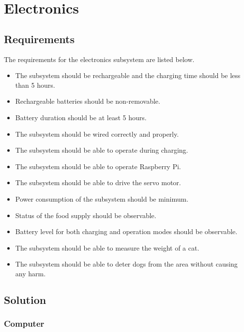 \section{Electronics} \label{sec:elec}

\subsection{Requirements}

The requirements for the electronics subsystem are listed below.
\begin{itemize}
\item The subsystem should be rechargeable and the charging time should be less than 5 hours. %

\item Rechargeable batteries should be non-removable.
\item Battery duration should be at least 5 hours.
\item The subsystem should be wired correctly and properly.
\item The subsystem should be able to operate during charging.
\item The subsystem should be able to operate Raspberry Pi.
\item The subsystem should be able to drive the servo motor.
\item Power consumption of the subsystem should be minimum. %
\item Status of the food supply should be observable.
\item Battery level for both charging and operation modes should be observable.
\item The subsystem should be able to measure the weight of a cat.
\item The subsystem should be able to deter dogs from the area without causing any harm.
\end{itemize}

\subsection{Solution}



 
 
 
 \subsubsection{Computer}
 
